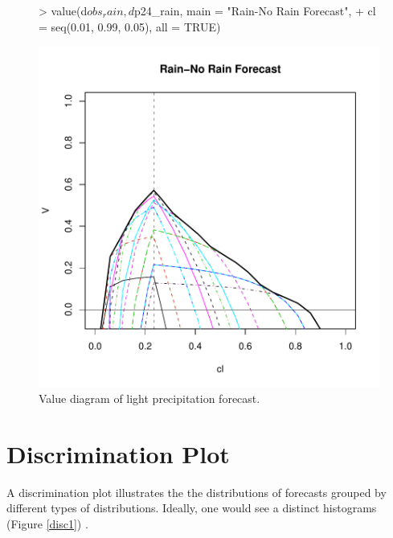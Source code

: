 \documentclass{article}
\begin{document}
\begin {center}
\begin{figure}[H]
\begin{Schunk}
\begin{Sinput}
> value(d$obs_rain, d$p24_rain, main = "Rain-No Rain Forecast", 
+     cl = seq(0.01, 0.99, 0.05), all = TRUE)
\end{Sinput}
\end{Schunk}
\includegraphics{verification-007}
\caption{\label{val1} Value diagram of light precipitation forecast. }
\end{figure}
\end{center}    

  

\section{Discrimination Plot}
A discrimination plot illustrates the the distributions of forecasts
grouped by different types of distributions.  Ideally, one would see a
distinct histograms (Figure \ref{disc1}) .  
\end{document}
